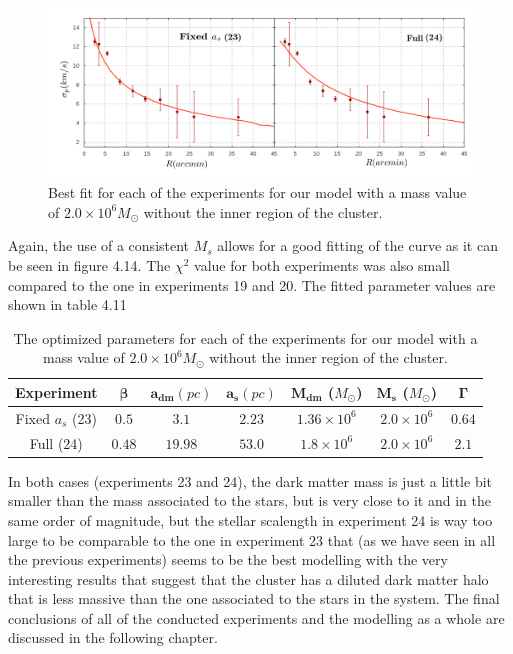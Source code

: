 \begin{figure}[H]
\centering
\includegraphics[width=15cm]{images/Starlight_25_10_1.png}
\caption[Best fits for our model with a mass value based on the Starlight procedures without the inner region.]{Best fit for each of the experiments for our model with a mass value of $2.0 \times 10^{6} M_{\odot}$ without the inner region of the cluster.}
\end{figure}

Again, the use of a consistent $M_s$ allows for a good fitting of the curve as it can be seen in figure 4.14. The $\chi^{2}$ value for both experiments was also small compared to the one in experiments 19 and 20. The fitted parameter values are shown in table 4.11

\begin{table}[H]
\centering
\begin{tabular}{| c| c| c| c| c| c| c|}
    \hline
    \textbf{Experiment} & $\mathbf{\beta}$ & $\mathbf{a_{dm}} (pc)$ & $\mathbf{a_{s}} (pc)$ & $\mathbf{M_{dm}}$ ($M_{\odot}$) & $\mathbf{M_{s}}$ ($M_{\odot}$) & $\mathbf{\Gamma}$\\ \hline
	Fixed $a_s$ (23) &	$0.5$ &	$3.1$ &	$\mathbf{2.23}$ &	$1.36 \times 10^{6}$ &	$2.0 \times 10 ^{6}$ &	$0.64$\\ \hline
	Full (24) &	$0.48$ &	$19.98$ &	$53.0$ &	$1.8 \times 10^{6}$ &	$2.0 \times 10^{6}$ &	$2.1$\\ \hline
  \end{tabular} 
\caption[Optimized parameters for our model with a mass value based on the Starlight procedures without the inner region.]{The optimized parameters for each of the experiments for our model with a mass value of $2.0 \times 10^{6} M_{\odot}$ without the inner region of the cluster.} 
\end{table}

In both cases (experiments 23 and 24), the dark matter mass is just a little bit smaller than the mass associated to the stars, but is very close to it and in the same order of magnitude, but the stellar scalength in experiment 24 is way too large to be comparable to the one in experiment 23 that (as we have seen in all the previous experiments) seems to be the best modelling with the very interesting results that suggest that the cluster has a diluted dark matter halo that is less massive than the one associated to the stars in the system. The final conclusions of all of the conducted experiments and the modelling as a whole are discussed in the following chapter.